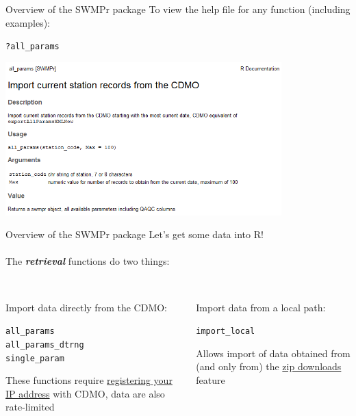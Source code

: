 \documentclass[xcolor=svgnames]{beamer}\usepackage[]{graphicx}\usepackage[]{color}
\makeatletter
\newcommand{\hlopt}[1]{\textcolor[rgb]{0,0,0}{#1}}%
\newcommand{\hlstd}[1]{\textcolor[rgb]{0.345,0.345,0.345}{#1}}%
\newenvironment{kframe}{%
 \def\at@end@of@kframe{}%
 \ifinner\ifhmode%
  \def\at@end@of@kframe{\end{minipage}}%
  \begin{minipage}{\columnwidth}%
 \fi\fi%
 \def\FrameCommand##1{\hskip\@totalleftmargin \hskip-\fboxsep
 \colorbox{shadecolor}{##1}\hskip-\fboxsep
     \hskip-\linewidth \hskip-\@totalleftmargin \hskip\columnwidth}%
 \MakeFramed {\advance\hsize-\width
   \@totalleftmargin\z@ \linewidth\hsize
   \@setminipage}}%
 {\par\unskip\endMakeFramed%
 \at@end@of@kframe}
\newenvironment{knitrout}{}{} %
\newcommand{\Bigtxt}[1]{\textbf{\textit{#1}}}
\makeatother
\begin{document}
\begin{frame}[fragile]{Overview of the SWMPr package}
To view the help file for any function (including examples):
\begin{knitrout}\scriptsize
{}\color{fgcolor}\begin{kframe}
\begin{alltt}
\hlopt{?}\hlstd{all_params}
\end{alltt}
\end{kframe}
\end{knitrout}
\centerline{\includegraphics[width = 0.8\textwidth]{help_ex.png}}
\end{frame}

\begin{frame}[fragile]{Overview of the SWMPr package}
Let's get some data into R!\\~\\
The \Bigtxt{retrieval} functions do two things: \\~\\
\begin{columns}[t]
\begin{column}{0.4\textwidth}
Import data directly from the CDMO:
\begin{knitrout}\scriptsize
{}\color{fgcolor}\begin{kframe}
\begin{alltt}
\hlstd{all_params}
\hlstd{all_params_dtrng}
\hlstd{single_param}
\end{alltt}
\end{kframe}
\end{knitrout}
These functions require \href{http://cdmo.baruch.sc.edu/webservices.cfm}{registering your IP address}  with CDMO, data are also rate-limited
\end{column}
\begin{column}{0.4\textwidth}
Import data from a local path:
\begin{knitrout}\scriptsize
{}\color{fgcolor}\begin{kframe}
\begin{alltt}
\hlstd{import_local}
\end{alltt}
\end{kframe}
\end{knitrout}
Allows import of data obtained from (and only from) the \href{http://cdmo.baruch.sc.edu/aqs/zips.cfm}{zip downloads} feature
\end{column}
\end{columns}
\end{frame}
\end{document}
